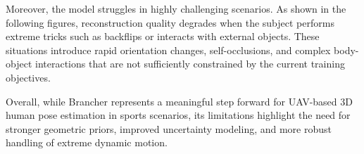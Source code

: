 Moreover, the model struggles in highly challenging scenarios. As shown in the following figures, reconstruction quality degrades when the subject performs extreme tricks such as backflips or interacts 
with external objects. These situations introduce rapid orientation changes, self-occlusions, and complex body-object interactions that are not sufficiently constrained by the current training objectives.

Overall, while Brancher represents a meaningful step forward for UAV-based 3D human pose estimation in sports scenarios, its limitations highlight the need for stronger geometric priors, improved 
uncertainty modeling, and more robust handling of extreme dynamic motion.


